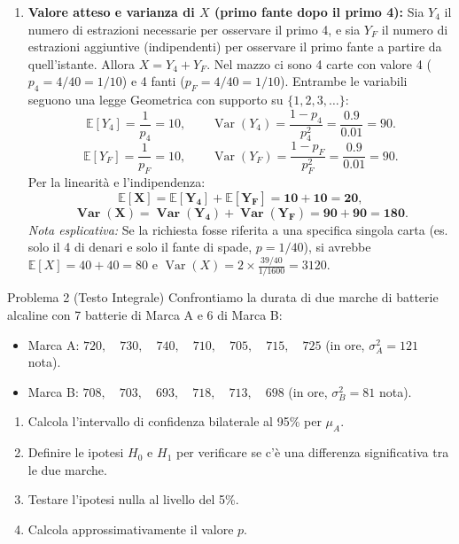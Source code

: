 \documentclass[11pt,a4paper]{article}
\newcommand{\EE}{\mathbb{E}}
\newcommand{\Var}{\operatorname{Var}}
\begin{document}
\begin{soluzionebox}
\begin{enumerate}[label=(\alph*)]
    \item \textbf{Valore atteso e varianza di $X$ (primo fante dopo il primo 4):}
    Sia $Y_4$ il numero di estrazioni necessarie per osservare il primo 4, e sia $Y_F$ il numero di estrazioni aggiuntive (indipendenti) per osservare il primo fante a partire da quell'istante.
    Allora $X = Y_4 + Y_F$.
    Nel mazzo ci sono 4 carte con valore 4 ($p_4 = 4/40 = 1/10$) e 4 fanti ($p_F = 4/40 = 1/10$).
    Entrambe le variabili seguono una legge Geometrica con supporto su $\{1, 2, 3, \dots\}$:
    \[
    \EE[Y_4] = \frac{1}{p_4} = 10, \qquad \Var(Y_4) = \frac{1 - p_4}{p_4^2} = \frac{0.9}{0.01} = 90.
    \]
    \[
    \EE[Y_F] = \frac{1}{p_F} = 10, \qquad \Var(Y_F) = \frac{1 - p_F}{p_F^2} = \frac{0.9}{0.01} = 90.
    \]
    Per la linearità e l'indipendenza:
    \[
    \mathbf{\EE[X] = \EE[Y_4] + \EE[Y_F] = 10 + 10 = 20},
    \]
    \[
    \mathbf{\Var(X) = \Var(Y_4) + \Var(Y_F) = 90 + 90 = 180}.
    \]
    \emph{Nota esplicativa:} Se la richiesta fosse riferita a una specifica singola carta (es. solo il 4 di denari e solo il fante di spade, $p = 1/40$), si avrebbe $\EE[X] = 40 + 40 = 80$ e $\Var(X) = 2 \times \frac{39/40}{1/1600} = 3120$.
\end{enumerate}
\end{soluzionebox}

\begin{problemabox}{Problema 2 (Testo Integrale)}
Confrontiamo la durata di due marche di batterie alcaline con 7 batterie di Marca A e 6 di Marca B:
\begin{itemize}
    \item Marca A: $720, \quad 730, \quad 740, \quad 710, \quad 705, \quad 715, \quad 725$ (in ore, $\sigma_A^2 = 121$ nota).
    \item Marca B: $708, \quad 703, \quad 693, \quad 718, \quad 713, \quad 698$ (in ore, $\sigma_B^2 = 81$ nota).
\end{itemize}
\begin{enumerate}[label=(\alph*)]
    \item Calcola l'intervallo di confidenza bilaterale al 95\% per $\mu_A$.
    \item Definire le ipotesi $H_0$ e $H_1$ per verificare se c'è una differenza significativa tra le due marche.
    \item Testare l'ipotesi nulla al livello del 5\%.
    \item Calcola approssimativamente il valore $p$.
\end{enumerate}
\end{problemabox}
\end{document}
